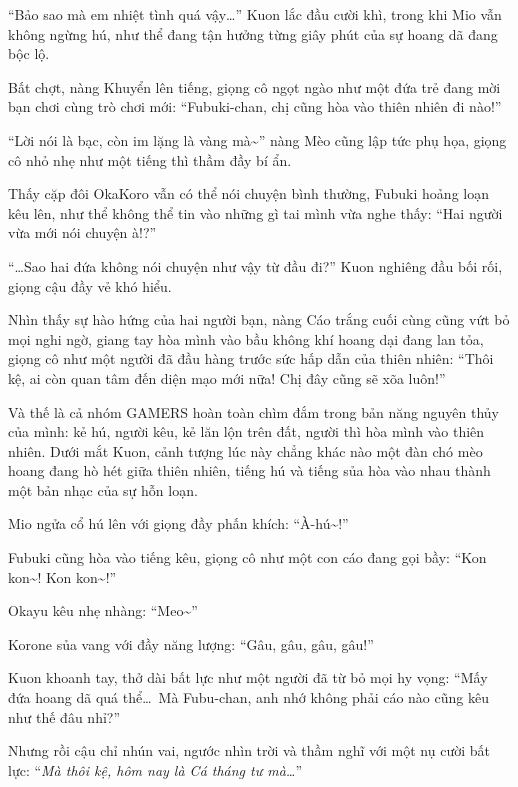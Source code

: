 \documentclass[../main.tex]{subfiles}
\begin{document}
``Bảo sao mà em nhiệt tình quá vậy\dots'' Kuon lắc đầu cười khì, trong khi Mio vẫn không ngừng hú, như thể đang tận hưởng từng giây phút của sự hoang dã đang bộc lộ.

Bất chợt, nàng Khuyển lên tiếng, giọng cô ngọt ngào như một đứa trẻ đang mời bạn chơi cùng trò chơi mới: ``Fubuki-chan, chị cũng hòa vào thiên nhiên đi nào!''

``Lời nói là bạc, còn im lặng là vàng mà\~{}'' nàng Mèo cũng lập tức phụ họa, giọng cô nhỏ nhẹ như một tiếng thì thầm đầy bí ẩn.

Thấy cặp đôi OkaKoro vẫn có thể nói chuyện bình thường, Fubuki hoảng loạn kêu lên, như thể không thể tin vào những gì tai mình vừa nghe thấy: ``Hai người vừa mới nói chuyện à!?''

``\dots Sao hai đứa không nói chuyện như vậy từ đầu đi?'' Kuon nghiêng đầu bối rối, giọng cậu đầy vẻ khó hiểu.

Nhìn thấy sự hào hứng của hai người bạn, nàng Cáo trắng cuối cùng cũng vứt bỏ mọi nghi ngờ, giang tay hòa mình vào bầu không khí hoang dại đang lan tỏa, giọng cô như một người đã đầu hàng trước sức hấp dẫn của thiên nhiên: ``Thôi kệ, ai còn quan tâm đến diện mạo mới nữa! Chị đây cũng sẽ xõa luôn!''

Và thế là cả nhóm GAMERS hoàn toàn chìm đắm trong bản năng nguyên thủy của mình: kẻ hú, người kêu, kẻ lăn lộn trên đất, người thì hòa mình vào thiên nhiên. Dưới mắt Kuon, cảnh tượng lúc này chẳng khác nào một đàn chó mèo hoang đang hò hét giữa thiên nhiên, tiếng hú và tiếng sủa hòa vào nhau thành một bản nhạc của sự hỗn loạn.

Mio ngửa cổ hú lên với giọng đầy phấn khích: ``À-hú\~{}!''

Fubuki cũng hòa vào tiếng kêu, giọng cô như một con cáo đang gọi bầy: ``Kon kon\~{}! Kon kon\~{}!''

Okayu kêu nhẹ nhàng: ``Meo\~{}''

Korone sủa vang với đầy năng lượng: ``Gâu, gâu, gâu, gâu!''

Kuon khoanh tay, thở dài bất lực như một người đã từ bỏ mọi hy vọng: ``Mấy đứa hoang dã quá thể\dots\ Mà Fubu-chan, anh nhớ không phải cáo nào cũng kêu như thế đâu nhỉ?''

Nhưng rồi cậu chỉ nhún vai, ngước nhìn trời và thầm nghĩ với một nụ cười bất lực: ``\textit{Mà thôi kệ, hôm nay là Cá tháng tư mà\dots}''

\omk
\end{document}
